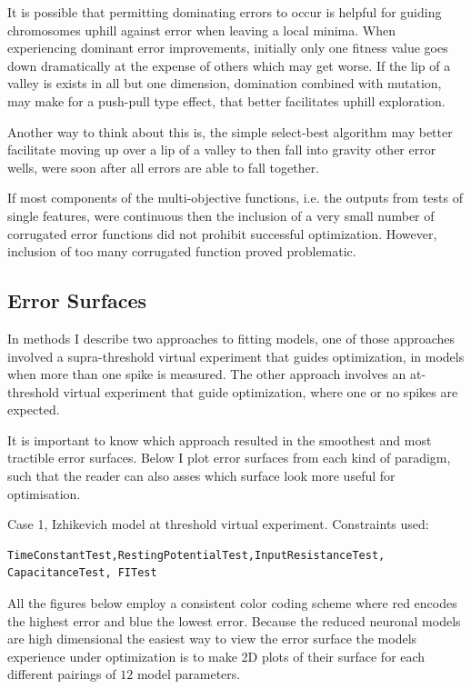 It is possible that permitting dominating errors to occur is helpful for guiding chromosomes uphill against error when leaving a local minima. When experiencing dominant error improvements, initially only one fitness value goes down dramatically at the expense of others which may get worse. If the lip of a valley is exists in all but one dimension, domination combined with mutation, may make for a push-pull type effect, that better facilitates uphill exploration. 

Another way to think about this is, the simple select-best algorithm may better facilitate moving up over a lip of a valley to then fall into gravity other error wells, were soon after all errors are able to fall together.



If most components of the multi-objective functions, i.e. the outputs from tests of single features, were continuous then the inclusion of a very small number of corrugated error functions did not prohibit successful optimization.
However, inclusion of too many corrugated function proved problematic.

\subsection{Error Surfaces}
In methods I describe two approaches to fitting models, one of those approaches involved a supra-threshold virtual experiment that guides optimization, in models when more than one spike is measured. The other approach involves an at-threshold virtual experiment that guide optimization, where one or no spikes are expected.

It is important to know which approach resulted in the smoothest and most tractible error surfaces. Below I plot error surfaces from each kind of paradigm, such that the reader can also asses which surface look more useful for optimisation. 

Case 1, Izhikevich model at threshold virtual experiment. Constraints used:
\begin{verbatim}
TimeConstantTest,RestingPotentialTest,InputResistanceTest, CapacitanceTest, FITest
\end{verbatim}

All the figures below employ a consistent color coding scheme where red encodes the highest error and blue the lowest error. Because the reduced neuronal models are high dimensional the easiest way to view the error surface the models experience under optimization is to make 2D plots of their surface for each different pairings of $12$ model parameters.

